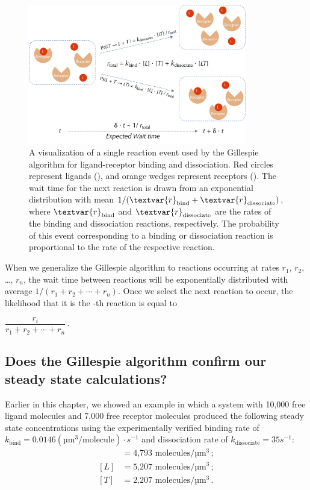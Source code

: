 \begin{figure}[h]
\centering
\mySfFamily
\includegraphics[width = 0.85\textwidth]{../images/chemotaxis_visualizessa.png}
\caption{A visualization of a single reaction event used by the Gillespie algorithm for ligand-receptor binding and dissociation. Red circles represent ligands (), and orange wedges represent receptors (). The wait time for the next reaction is drawn from an exponential distribution with mean $\text{1}/(\textvar{r}_\text{bind} + \textvar{r}_\text{dissociate})$, where $\textvar{r}_\text{bind}$ and $\textvar{r}_\text{dissociate}$ are the rates of the binding and dissociation reactions, respectively. The probability of this event corresponding to a binding or dissociation reaction is proportional to the rate of the respective reaction.}
\label{fig:chemotaxis_visualizessa}
\end{figure}

When we generalize the Gillespie algorithm to  reactions occurring at rates $r_1$, $r_2$, \ldots, $r_n$, the wait time between reactions will be exponentially distributed with average $1 / (r_1 + r_2 + \cdots + r_n)$. Once we select the next reaction to occur, the likelihood that it is the -th reaction is equal to

\begin{center}
$\dfrac{r_i}{r_1 + r_2 + \cdots + r_n}$\,.
\end{center}


\FloatBarrier
{}
\subsection{Does the Gillespie algorithm confirm our steady state calculations?}

Earlier in this chapter, we showed an example in which a system with 10,000 free ligand molecules and 7,000 free receptor molecules produced the following steady state concentrations using the experimentally verified binding rate of $k_\text{bind} = 0.0146 (\text{µm}^3/\text{molecule}) \cdot s^{-1}$ and dissociation rate of $k_\text{dissociate} = 35s^{-1}$:
\begin{align*}
[LT] & = \text{4,793 molecules}/\text{µm}^3\,;\\
[L] & = \text{5,207 molecules}/\text{µm}^3\,;\\
[T] & = \text{2,207 molecules}/\text{µm}^3\,.
\end{align*}

